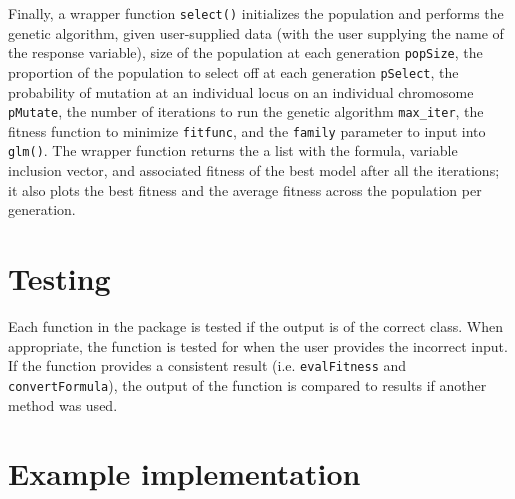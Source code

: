 \documentclass{article}\usepackage[]{graphicx}\usepackage[]{color}
\begin{document}
Finally, a wrapper function \texttt{select()} initializes the population and performs the genetic algorithm, given user-supplied data (with the user supplying the name of the response variable), size of the population at each generation \texttt{popSize}, the proportion of the population to select off at each generation \texttt{pSelect}, the probability of mutation at an individual locus on an individual chromosome \texttt{pMutate}, the number of iterations to run the genetic algorithm \texttt{max\_iter}, the fitness function to minimize \texttt{fitfunc}, and the \texttt{family} parameter to input into \texttt{glm()}. The wrapper function returns the a list with the formula, variable inclusion vector, and associated fitness of the best model after all the iterations; it also plots the best fitness and the average fitness across the population per generation.

\section{Testing}

Each function in the package is tested if the output is of the correct class. When appropriate, the function is tested for when the user provides the incorrect input. If the function provides a consistent result (i.e. \texttt{evalFitness} and \texttt{convertFormula}), the output of the function is compared to results if another method was used.  

\section{Example implementation}
\end{document}
